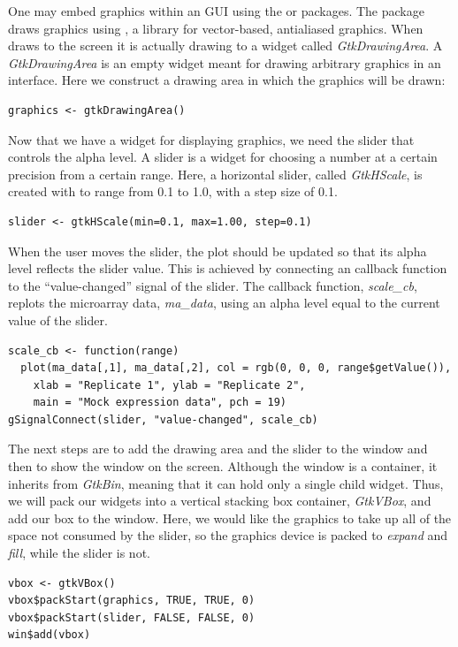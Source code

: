 \documentclass[article]{jss}
\begin{document}
One may embed  graphics within an  GUI using the 
 \citep{cairoDevice} or  \citep{gtkDevice}
packages. The  package draws  graphics using 
 \citep{cairo}, a library for vector-based, antialiased graphics.
When  draws to the screen it is actually drawing to a 
 widget called \emph{GtkDrawingArea}. A \emph{GtkDrawingArea}
is an empty widget meant for drawing arbitrary graphics in an interface. Here we 
construct a drawing area in which the  graphics will be drawn:
\begin{verbatim}
graphics <- gtkDrawingArea()
\end{verbatim}

Now that we have a widget for displaying  graphics, we need the slider
that controls the alpha level. A slider is a widget for choosing a number
at a certain precision from a certain range. Here, a horizontal slider, called
\emph{GtkHScale}, is created with to range from 0.1 to 1.0, with a step size of 0.1.
\begin{verbatim}
slider <- gtkHScale(min=0.1, max=1.00, step=0.1)
\end{verbatim}

When the user moves the slider, the plot should be updated so that its alpha
level reflects the slider value. This is achieved by connecting
an  callback function to the ``value-changed'' signal of the slider. 
The callback function, \emph{scale\_cb}, replots the microarray data, \emph{ma\_data}, using
an alpha level equal to the current value of the slider. 
\begin{verbatim}
scale_cb <- function(range) 
  plot(ma_data[,1], ma_data[,2], col = rgb(0, 0, 0, range$getValue()),
    xlab = "Replicate 1", ylab = "Replicate 2", 
    main = "Mock expression data", pch = 19)
gSignalConnect(slider, "value-changed", scale_cb)
\end{verbatim}

The next steps are to add the drawing area and the slider to the
window and then to show the window on the screen. Although the window is a
container, it inherits from \emph{GtkBin}, meaning that it can hold only
a single child widget. Thus, we will pack our widgets into a vertical stacking 
box container, \emph{GtkVBox}, and add our box to the window.
Here, we would like the graphics to take up all of the space not consumed by the
slider, so the graphics device is packed to \emph{expand} and \emph{fill}, while
the slider is not.
\begin{verbatim}
vbox <- gtkVBox()
vbox$packStart(graphics, TRUE, TRUE, 0)
vbox$packStart(slider, FALSE, FALSE, 0)
win$add(vbox)
\end{verbatim}
\end{document}
